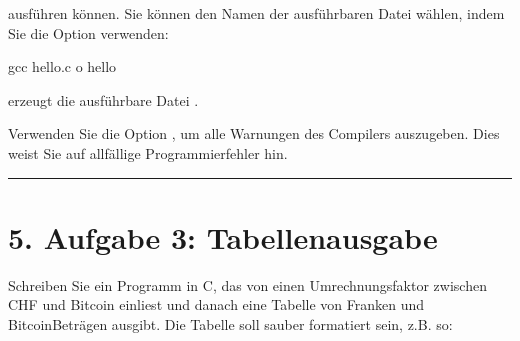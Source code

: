 \documentclass[a4paper,10pt,english]{report}
\begin{document}
\sphinxAtStartPar
ausführen können. Sie können den Namen der ausführbaren Datei wählen, indem Sie die Option  verwenden:

\begin{sphinxVerbatim}[commandchars=\\\{\}]
\PYGZdl{}\PYGZgt{} gcc hello.c \PYGZhy{}o hello
\end{sphinxVerbatim}

\sphinxAtStartPar
erzeugt die ausführbare Datei .

\sphinxAtStartPar
Verwenden Sie die Option , um alle Warnungen des Compilers auszugeben. Dies weist Sie auf allfällige Programmierfehler hin.


\bigskip\hrule\bigskip



\section{5. Aufgabe 3: Tabellenausgabe}
\label{\detokenize{P01_Erste_Schritte_mit_C/README:aufgabe-3-tabellenausgabe}}
\sphinxAtStartPar
Schreiben Sie ein Programm in C, das von  einen Umrechnungsfaktor zwischen CHF und Bitcoin einliest und danach eine Tabelle von Franken\sphinxhyphen{} und Bitcoin\sphinxhyphen{}Beträgen ausgibt. Die Tabelle soll sauber formatiert sein, z.B. so:
\end{document}

